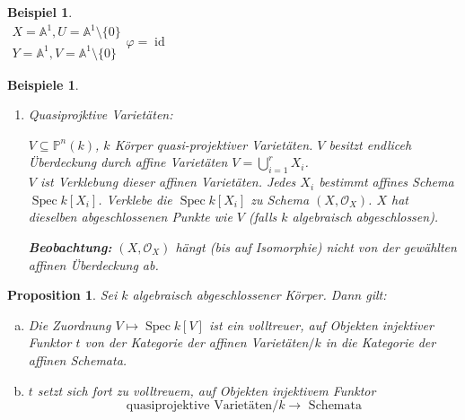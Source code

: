 \documentclass[a4paper,12pt]{report}
\theoremstyle{break}
\newtheorem{Prop}[Def]{Proposition}
\theoremstyle{nonumberbreak}
\newtheorem{bsp}{Beispiel}
\newtheorem{bspe}{Beispiele}
\theoremstyle{nonumberplain}
\newcommand{\quot}[1]{\textrm{\glqq}{#1}\textrm{\grqq}}
\DeclareMathOperator{\Spec}{Spec}
\DeclareMathOperator{\id}{id}
\newcommand{\A}{\mathbb{A}}
\newcommand{\IP}{\mathbb{P}}%
\newcommand{\calO}{\mathcal{O}}
\begin{document}
\begin{bsp}\textcolor{white}{\,}\\
$\begin{array}{l}X = \A^1, U = \A^1\setminus \{0\} \\ Y = \A^1, V = \A^1\setminus \{0\}\end{array} \varphi = \id \qquad$
\end{bsp}

\begin{bspe}\begin{enumerate}[1)]\item
Quasiprojktive Variet\"aten:

$V\subseteq \IP^n(k)$, $k$ K\"orper quasi-projektiver Variet\"aten. $V$ besitzt endliceh \"Uberdeckung durch affine Variet\"aten $V= \bigcup\limits_{i=1}^r X_i$.\\
$V$ ist \quot{Verklebung} dieser affinen Variet\"aten. Jedes $X_i$ bestimmt affines Schema $\Spec k[X_i]$. Verklebe die $\Spec k[X_i]$ zu Schema $(X,\calO_X)$. $X$ hat dieselben abgeschlossenen Punkte wie $V$ (falls $k$ algebraisch abgeschlossen).

\textbf{Beobachtung:} $(X, \calO_X)$ h\"angt (bis auf Isomorphie) nicht von der gew\"ahlten affinen \"Uberdeckung ab.
\end{enumerate}\end{bspe}

\begin{Prop}
Sei $k$ algebraisch abgeschlossener K\"orper. Dann gilt:
\begin{enumerate}[a)]
\item
	Die Zuordnung $V\mapsto \Spec k[V]$ ist ein volltreuer, auf Objekten injektiver Funktor $t$ von der Kategorie der affinen Variet\"aten$/k$ in die Kategorie der affinen Schemata.
\item
	$t$ setzt sich fort zu volltreuem, auf Objekten injektivem Funktor
		\[ \text{quasiprojektive Variet\"aten}/k \to \text{ Schemata} \]
\end{enumerate}\end{Prop}
\end{document}
